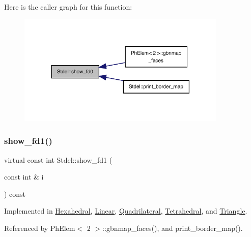 Here is the caller graph for this function\+:
\nopagebreak
\begin{figure}[H]
\begin{center}
\leavevmode
\includegraphics[width=283pt]{classStdel_a0e05ccae64925915af5f07c91d61c7bc_icgraph}
\end{center}
\end{figure}
\mbox{\label{classStdel_af4a394fae421489159f40ddcb736353b}} 
\subsubsection{\texorpdfstring{show\+\_\+fd1()}{show\_fd1()}}
{\footnotesize\ttfamily virtual const int Stdel\+::show\+\_\+fd1 (\begin{DoxyParamCaption}\item[{const int \&}]{i }\end{DoxyParamCaption}) const\hspace{0.3cm}{\ttfamily [pure virtual]}}



Implemented in \hyperlink{classHexahedral_aba5fb014249bf374e52bcfbfa9576288}{Hexahedral}, \hyperlink{classLinear_a8c97f726b71671ed6eac8ef83e136a04}{Linear}, \hyperlink{classQuadrilateral_a679e364920cf90d28114bf85a525408f}{Quadrilateral}, \hyperlink{classTetrahedral_ad45fb011e33abc16947617e99a30882a}{Tetrahedral}, and \hyperlink{classTriangle_a3635411b31e3fe7dbe226efe5de45094}{Triangle}.



Referenced by Ph\+Elem$<$ 2 $>$\+::gbnmap\+\_\+faces(), and print\+\_\+border\+\_\+map().

